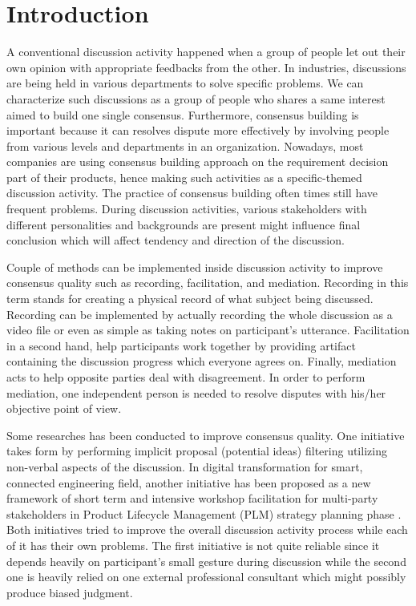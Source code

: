 \documentclass[conference]{IEEEtran}
\begin{document}
\section{Introduction}
A conventional discussion activity happened when a group of people let out their own opinion with appropriate feedbacks from the other. In industries, discussions are being held in various departments to solve specific problems. We can characterize such discussions as a group of people who shares a same interest aimed to build one single consensus. Furthermore, consensus building is important because it can resolves dispute more effectively by involving people from various levels and departments in an organization\cite{b1}. Nowadays, most companies are using consensus building approach on the requirement decision part of their products, hence making such activities as a specific-themed discussion activity. The practice of consensus building often times still have frequent problems. During discussion activities, various stakeholders with different personalities and backgrounds are present might influence final conclusion\cite{b2} which will affect tendency and direction of the discussion\cite{b3}.
 
Couple of methods can be implemented inside discussion activity to improve consensus quality such as recording, facilitation, and mediation\cite{b1}. Recording in this term stands for creating a physical record of what subject being discussed. Recording can be implemented by actually recording the whole discussion as a video file or even as simple as taking notes on participant's utterance. Facilitation in a second hand, help participants work together by providing artifact containing the discussion progress which everyone agrees on. Finally, mediation acts to help opposite parties deal with disagreement. In order to perform mediation, one independent person is needed to resolve disputes with his/her objective point of view.

Some researches has been conducted to improve consensus quality. One initiative takes form by performing implicit proposal (potential ideas) filtering utilizing non-verbal aspects of the discussion\cite{b5}. In digital transformation for smart, connected engineering field, another initiative has been proposed as a new framework of short term and intensive workshop facilitation for multi-party stakeholders in Product Lifecycle Management (PLM) strategy  planning phase \cite{b4}. Both initiatives tried to improve the overall discussion activity process while each of it has their own problems. The first initiative is not quite reliable since it depends heavily on participant's small gesture during discussion while the second one is heavily relied on one external professional consultant which might possibly produce biased judgment.
\end{document}
